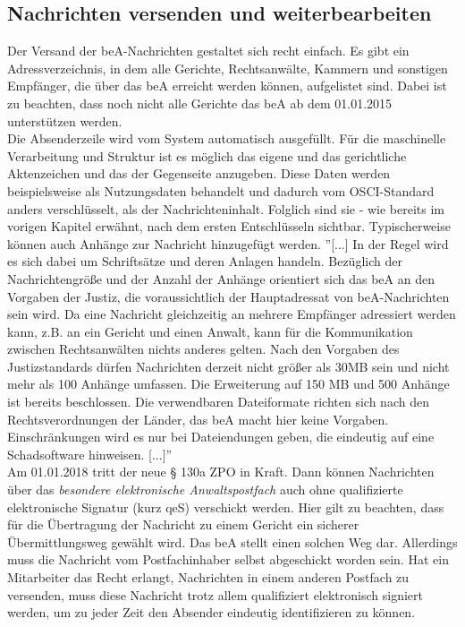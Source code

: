 \subsection{Nachrichten versenden und weiterbearbeiten}
Der Versand der beA-Nachrichten gestaltet sich recht einfach. Es gibt ein Adressverzeichnis, in dem alle Gerichte, Rechtsanwälte, Kammern und sonstigen Empfänger, die über das beA erreicht werden können, aufgelistet sind. Dabei ist zu beachten, dass noch nicht alle Gerichte das beA ab dem 01.01.2015 unterstützen werden. \\
Die Absenderzeile wird vom System automatisch ausgefüllt. Für die maschinelle Verarbeitung und Struktur ist es möglich das eigene und das gerichtliche Aktenzeichen und das der Gegenseite anzugeben. Diese Daten werden beispielsweise als Nutzungsdaten behandelt und dadurch vom OSCI-Standard anders verschlüsselt, als der Nachrichteninhalt. Folglich sind sie - wie bereits im vorigen Kapitel erwähnt, nach dem ersten Entschlüsseln sichtbar. Typischerweise können auch Anhänge zur Nachricht hinzugefügt werden. ''[...] In der Regel wird es sich dabei um Schriftsätze und deren Anlagen handeln. Bezüglich der Nachrichtengröße und der Anzahl der Anhänge orientiert sich das beA an den Vorgaben der Justiz, die voraussichtlich der Hauptadressat von beA-Nachrichten sein wird. Da eine Nachricht gleichzeitig an mehrere Empfänger adressiert werden kann, z.B. an ein Gericht und einen Anwalt, kann für die Kommunikation zwischen Rechtsanwälten nichts anderes gelten. Nach den Vorgaben des Justizstandards dürfen Nachrichten derzeit nicht größer als 30MB sein und nicht mehr als 100 Anhänge umfassen. Die Erweiterung auf 150 MB und 500 Anhänge ist bereits beschlossen. Die verwendbaren Dateiformate richten sich nach den Rechtsverordnungen der Länder, das beA macht hier keine Vorgaben. Einschränkungen wird es nur bei Dateiendungen geben, die eindeutig auf eine Schadsoftware hinweisen. [...]'' \textcite{bea:bea:brak3/2015} \\
Am 01.01.2018 tritt der neue § 130a ZPO in Kraft. Dann können Nachrichten über das \textit{besondere elektronische Anwaltspostfach} auch ohne qualifizierte elektronische Signatur (kurz qeS) verschickt werden. Hier gilt zu beachten, dass für die Übertragung der Nachricht zu einem Gericht ein sicherer Übermittlungsweg gewählt wird. Das beA stellt einen solchen Weg dar. Allerdings muss die Nachricht vom Postfachinhaber selbst abgeschickt worden sein. Hat ein Mitarbeiter das Recht erlangt, Nachrichten in einem anderen Postfach zu versenden, muss diese Nachricht trotz allem qualifiziert elektronisch signiert werden, um zu jeder Zeit den Absender eindeutig identifizieren zu können. \\
